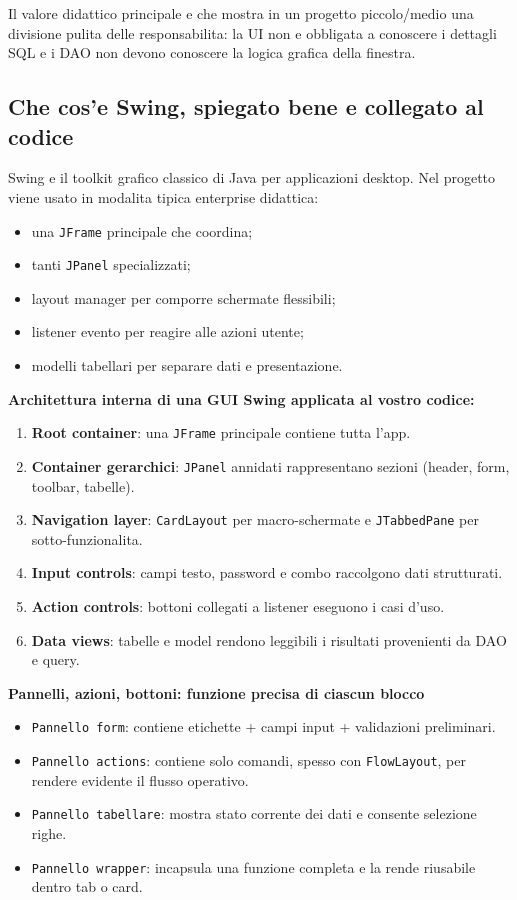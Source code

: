 \documentclass[12pt,a4paper]{article}
\begin{document}
Il valore didattico principale e che mostra in un progetto piccolo/medio una divisione pulita delle responsabilita:
la UI non e obbligata a conoscere i dettagli SQL e i DAO non devono conoscere la logica grafica della finestra.

\subsection{Che cos'e Swing, spiegato bene e collegato al codice}
Swing e il toolkit grafico classico di Java per applicazioni desktop.
Nel progetto viene usato in modalita tipica enterprise didattica:
\begin{itemize}
  \item una \texttt{JFrame} principale che coordina;
  \item tanti \texttt{JPanel} specializzati;
  \item layout manager per comporre schermate flessibili;
  \item listener evento per reagire alle azioni utente;
  \item modelli tabellari per separare dati e presentazione.
\end{itemize}

\textbf{Architettura interna di una GUI Swing applicata al vostro codice:}
\begin{enumerate}
  \item \textbf{Root container}: una \texttt{JFrame} principale contiene tutta l'app.
  \item \textbf{Container gerarchici}: \texttt{JPanel} annidati rappresentano sezioni (header, form, toolbar, tabelle).
  \item \textbf{Navigation layer}: \texttt{CardLayout} per macro-schermate e \texttt{JTabbedPane} per sotto-funzionalita.
  \item \textbf{Input controls}: campi testo, password e combo raccolgono dati strutturati.
  \item \textbf{Action controls}: bottoni collegati a listener eseguono i casi d'uso.
  \item \textbf{Data views}: tabelle e model rendono leggibili i risultati provenienti da DAO e query.
\end{enumerate}

\textbf{Pannelli, azioni, bottoni: funzione precisa di ciascun blocco}
\begin{itemize}
  \item \texttt{Pannello form}: contiene etichette + campi input + validazioni preliminari.
  \item \texttt{Pannello actions}: contiene solo comandi, spesso con \texttt{FlowLayout}, per rendere evidente il flusso operativo.
  \item \texttt{Pannello tabellare}: mostra stato corrente dei dati e consente selezione righe.
  \item \texttt{Pannello wrapper}: incapsula una funzione completa e la rende riusabile dentro tab o card.
\end{itemize}
\end{document}
